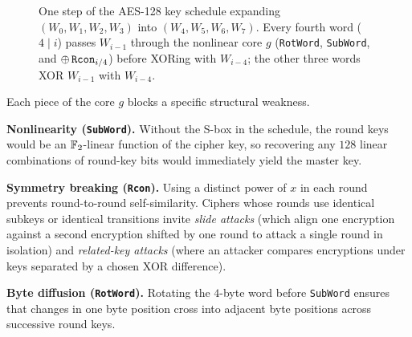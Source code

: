 \begin{figure}[htbp]
\caption{One step of the AES-128 key schedule expanding $(W_0, W_1, W_2, W_3)$ into $(W_4, W_5, W_6, W_7)$. Every fourth word ($4 \mid i$) passes $W_{i-1}$ through the nonlinear core $g$ (\texttt{RotWord}, \texttt{SubWord}, and $\oplus\,\texttt{Rcon}_{i/4}$) before XORing with $W_{i-4}$; the other three words XOR $W_{i-1}$ with $W_{i-4}$.}
\label{ch12:fig-key-schedule}
\end{figure}

\begin{whybox}
Each piece of the core $g$ blocks a specific structural weakness.

\textbf{Nonlinearity (\texttt{SubWord}).} Without the S-box in the schedule, the
round keys would be an $\mathbb{F}_2$-linear function of the cipher key, so recovering any
$128$ linear combinations of round-key bits would immediately yield the master key.

\textbf{Symmetry breaking (\texttt{Rcon}).} Using a distinct power of $x$ in each
round prevents round-to-round self-similarity. Ciphers whose rounds use identical
subkeys or identical transitions invite \emph{slide attacks} (which align one
encryption against a second encryption shifted by one round to attack a single
round in isolation) and \emph{related-key attacks} (where an attacker compares
encryptions under keys separated by a chosen XOR difference).

\textbf{Byte diffusion (\texttt{RotWord}).} Rotating the $4$-byte word before
\texttt{SubWord} ensures that changes in one byte position cross into adjacent
byte positions across successive round keys.
\end{whybox}

